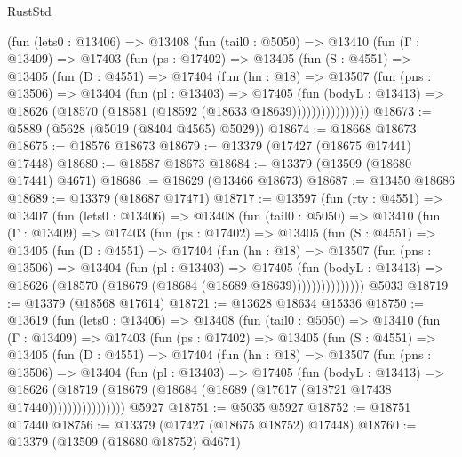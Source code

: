 \begin{lexlean}{RustStd}
\begin{coremodule}
        (fun (lets0 : @13406) =>
        @13408
          (fun (tail0 : @5050) =>
          @13410
            (fun (Γ : @13409) =>
            @17403
              (fun (ps : @17402) =>
              @13405
                (fun (S : @4551) =>
                @13405
                  (fun (D : @4551) =>
                  @17404
                    (fun (hn : @18) =>
                    @13507
                      (fun (pns : @13506) =>
                      @13404
                        (fun (pl : @13403) =>
                        @17405
                          (fun (bodyL : @13413) =>
                          @18626 (@18570 (@18581 (@18592 (@18633 @18639))))))))))))))))
@18673 := @5889 (@5628 (@5019 (@8404 @4565) @5029))
@18674 := @18668 @18673
@18675 := @18576 @18673
@18679 := @13379 (@17427 (@18675 @17441) @17448)
@18680 := @18587 @18673
@18684 := @13379 (@13509 (@18680 @17441) @4671)
@18686 := @18629 (@13466 @18673)
@18687 := @13450 @18686
@18689 := @13379 (@18687 @17471)
@18717 := @13597
    (fun (rty : @4551) =>
    @13407
      (fun (lets0 : @13406) =>
      @13408
        (fun (tail0 : @5050) =>
        @13410
          (fun (Γ : @13409) =>
          @17403
            (fun (ps : @17402) =>
            @13405
              (fun (S : @4551) =>
              @13405
                (fun (D : @4551) =>
                @17404
                  (fun (hn : @18) =>
                  @13507
                    (fun (pns : @13506) =>
                    @13404
                      (fun (pl : @13403) =>
                      @17405
                        (fun (bodyL : @13413) =>
                        @18626 (@18570 (@18679 (@18684 (@18689 @18639)))))))))))))))
    @5033
@18719 := @13379 (@18568 @17614)
@18721 := @13628 @18634 @15336
@18750 := @13619
    (fun (lets0 : @13406) =>
    @13408
      (fun (tail0 : @5050) =>
      @13410
        (fun (Γ : @13409) =>
        @17403
          (fun (ps : @17402) =>
          @13405
            (fun (S : @4551) =>
            @13405
              (fun (D : @4551) =>
              @17404
                (fun (hn : @18) =>
                @13507
                  (fun (pns : @13506) =>
                  @13404
                    (fun (pl : @13403) =>
                    @17405
                      (fun (bodyL : @13413) =>
                      @18626
                        (@18719
                          (@18679 (@18684 (@18689 (@17617 (@18721 @17438 @17440))))))))))))))))
    @5927
@18751 := @5035 @5927
@18752 := @18751 @17440
@18756 := @13379 (@17427 (@18675 @18752) @17448)
@18760 := @13379 (@13509 (@18680 @18752) @4671)

\end{coremodule}
\end{lexlean}
